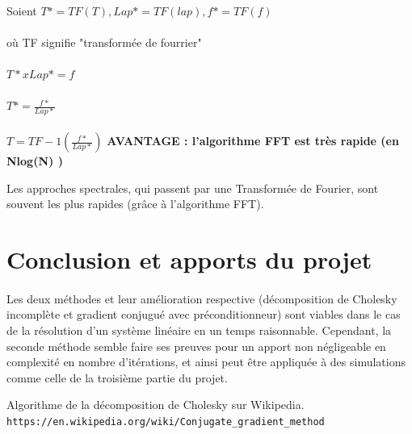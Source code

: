 \documentclass{article}
\begin{document}
\begin{enumerate}
  \paragraph{}
  Soient $T*= TF(T), Lap*=TF(lap) , f*=TF (f)$ 
  \paragraph{}
  où TF signifie "transformée de fourrier"
  \paragraph{}
  $T*xLap*= f$
  \paragraph{}
  $T*= \frac{f*}{Lap*}$ 
  \paragraph{}
  $T = TF-1 (\frac{f*}{Lap*})$  
  \textbf{ AVANTAGE : l’algorithme FFT est très rapide (en Nlog(N) )} 
  
  Les approches spectrales, qui passent par une Transformée de Fourier, sont souvent les plus
  rapides (grâce à l’algorithme FFT). 
  
   \fi
   
   \end{enumerate} 

   
  
   
    

\section*{Conclusion et apports du projet}
\paragraph{}
    Les deux méthodes et leur amélioration respective (décomposition de Cholesky
    incomplète et gradient conjugué avec préconditionneur) sont viables dans le 
    cas de la résolution d'un système linéaire en un temps raisonnable. 
    Cependant, la seconde méthode semble faire ses preuves pour un apport non 
    négligeable en complexité en nombre d'itérations, et ainsi peut être appliquée 
    à des simulations comme celle de la troisième partie du projet.

\begin{thebibliography}{9}
Algorithme de la décomposition de Cholesky sur Wikipedia.
\\\texttt{https://en.wikipedia.org/wiki/Conjugate\_gradient\_method}
\end{thebibliography}
\end{document}
